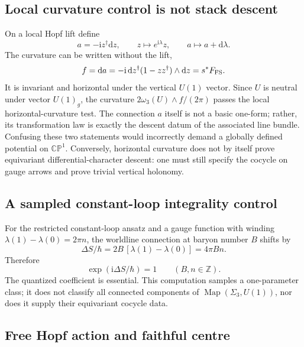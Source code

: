 \documentclass[11pt]{article}
\theoremstyle{definition}
\theoremstyle{remark}
\newcommand{\ii}{\mathrm i}
\newcommand{\dd}{\mathrm d}
\newcommand{\ZZ}{\mathbb Z}
\newcommand{\CP}{\mathbb {CP}}
\begin{document}
\subsection{Local curvature control is not stack descent}

On a local Hopf lift define
\begin{equation}
 a=-\ii z^\dagger\dd z,
 \qquad z\mapsto e^{\ii\lambda}z,
 \qquad a\mapsto a+\dd\lambda.
 \label{eq:hopf-connection}
\end{equation}
The curvature can be written without the lift,
\begin{equation}
 f=\dd a=-\ii\,\dd z^\dagger(1-zz^\dagger)\wedge\dd z
 =s^*F_{\rm FS}.
 \label{eq:basic-curvature}
\end{equation}
It is invariant and horizontal under the vertical \(U(1)\) vector.  Since
\(U\) is neutral under vector \(U(1)_g\), the curvature
\(2\omega_3(U)\wedge f/(2\pi)\) passes the local horizontal-curvature test.
The connection \(a\) itself
is not a basic one-form; rather, its transformation law is exactly the
descent datum of the associated line bundle.  Confusing these two statements
would incorrectly demand a globally defined potential on \(\CP^1\).
Conversely, horizontal curvature does not by itself prove equivariant
differential-character descent: one must still specify the cocycle on gauge
arrows and prove trivial vertical holonomy.

\subsection{A sampled constant-loop integrality control}

For the restricted constant-loop ansatz and a gauge function with winding
\(\lambda(1)-\lambda(0)=2\pi n\), the worldline connection at baryon number
\(B\) shifts by
\begin{equation}
 \Delta S/\hbar=2B\,[\lambda(1)-\lambda(0)]=4\pi Bn.
 \label{eq:large-gauge}
\end{equation}
Therefore
\begin{equation}
 \exp(\ii\Delta S/\hbar)=1
 \qquad(B,n\in\ZZ).
 \label{eq:large-invariance}
\end{equation}
The quantized coefficient is essential.  This computation samples a
one-parameter class; it does not classify all connected components of
\(\operatorname{Map}(\Sigma_3,U(1))\), nor does it supply their equivariant
cocycle data.

\subsection{Free Hopf action and faithful centre}
\end{document}
